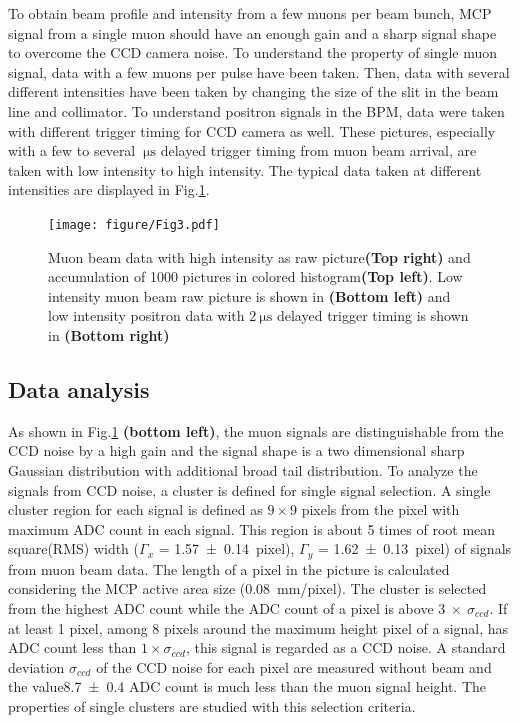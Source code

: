 \documentclass[preprint,3p,twocolumn]{elsarticle}
\begin{document}
To obtain beam profile and intensity from a few muons per beam bunch, MCP signal from a single muon should have an enough gain and a sharp signal shape to overcome the CCD camera noise.
To understand the property of single muon signal, data with a few muons per pulse have been taken. Then, data with several different intensities have been taken by changing the size of the slit in the beam line and collimator. To understand positron signals in the BPM, data were taken with different trigger timing for CCD camera as well. These pictures, especially with a few to several $\SI{}{\micro\s}$ delayed trigger timing from muon beam arrival, are taken with low intensity to high intensity.
The typical data taken at different intensities are displayed in Fig.\ref{fig:single_cluster}.

\begin{figure}[htb]
	\begin{minipage}[t]{70mm}
		\texttt{[image: figure/Fig3.pdf]}
	\end{minipage}
	\caption{Muon beam data with high intensity as raw picture{\bf(Top right)} and accumulation of 1000 pictures in colored histogram{\bf(Top left)}.
	Low intensity muon beam raw picture is shown in {\bf(Bottom left)} and low intensity positron data with $\SI{2}{\micro\s}$ delayed trigger timing is shown in {\bf(Bottom right)
	}}	
	\label{fig:single_cluster}
\end{figure}



\subsection{Data analysis}

As shown in Fig.\ref{fig:single_cluster} {\bf (bottom left)}, the muon signals are distinguishable from the CCD noise by a high gain and the signal shape is a two dimensional sharp Gaussian distribution with additional broad tail distribution. 
To analyze the signals from CCD noise, a cluster is defined for single signal selection. A single cluster region for each signal is defined as $9\times9$ pixels from the pixel with maximum ADC count in each signal. This region is about 5 times of root mean square(RMS) width ($\Gamma_{x}$ = \SI{1.57 \pm 0.14}{pixel}), $\Gamma_{y}$ = \SI{1.62 \pm 0.13}{pixel}) of signals from muon beam data. The length of a pixel in the picture is calculated considering the MCP active area size (\SI{0.08}{mm/pixel}).
The cluster is selected from the highest ADC count while the ADC count of a pixel is above $3~\times~\sigma_{ccd}$.
If at least 1 pixel, among 8 pixels around the maximum height pixel of a signal, has ADC count less than $1\times\sigma_{ccd}$, this signal is regarded as a CCD noise. 
A standard deviation $\sigma_{ccd}$ of the CCD noise for each pixel are measured without beam and the value\num{8.7 \pm 0.4} ADC count is much less than the muon signal height. The properties of single clusters are studied with this selection criteria.
\end{document}
